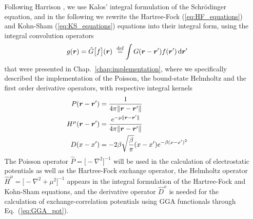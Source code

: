 Following Harrison \etal\cite{Harrison_basic:2004}, we use Kalos'\cite{Kalos:1962} integral 
formulation of the 
Schr\"{o}dinger equation, and in the following we rewrite the Hartree-Fock (\ref{eq:HF_equations}) 
and Kohn-Sham (\ref{eq:KS_equations}) equations into their integral form, using the integral 
convolution operators
\begin{equation}
    g(\bs{r}) = \hat{G}\big[f\big](\bs{r}) \mydef \int G(\bs{r}-\bs{r}') f(\bs{r}') \ud\bs{r}'
\end{equation}
that were presented in Chap.~\ref{chap:implementation}, where we specifically described
the implementation of the Poisson, the bound-state Helmholtz and the first order derivative 
operators, with respective integral kernels
\begin{align}
    P(\boldsymbol r-\boldsymbol r') &= \frac{1}{4\pi\|\boldsymbol r-\boldsymbol r'\|}\\
    H^\mu(\boldsymbol r-\boldsymbol r') &= \frac{e^{-\mu\|\boldsymbol r-\boldsymbol r'\|}}{4\pi\|\boldsymbol r-\boldsymbol r'\|}\\
    D(x-x') &= -2\beta \sqrt{\frac{\beta}{\pi}}(x-x')e^{-\beta (x-x')^2}
\end{align}
The Poisson operator $\hat{P}=\big[-\nabla^2\big]^{-1}$ will be used in the calculation of 
electrostatic potentials as well as the Hartree-Fock exchange operator, the Helmholtz 
operator $\hat{H}^\mu=\big[-\nabla^2+\mu^2\big]^{-1}$ appears in the integral formulation 
of the Hartree-Fock and Kohn-Sham equations, and the derivative operator $\hat{D}^x$ is 
needed for the calculation of exchange-correlation potentials using GGA functionals through
Eq.~(\ref{eq:GGA_pot}).

